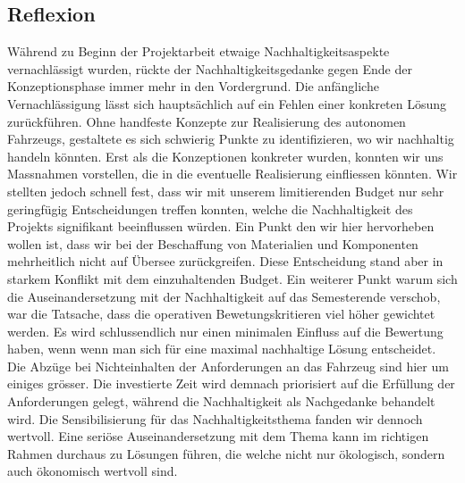 \documentclass[../../main.tex]{subfiles} %
\begin{document}
\subsection{Reflexion}

Während zu Beginn der Projektarbeit etwaige Nachhaltigkeitsaspekte
vernachlässigt
wurden, rückte der Nachhaltigkeitsgedanke gegen Ende der
Konzeptionsphase immer mehr in den Vordergrund.
Die anfängliche Vernachlässigung lässt sich hauptsächlich auf ein
Fehlen einer konkreten Lösung zurückführen.
Ohne handfeste Konzepte zur Realisierung des autonomen Fahrzeugs,
gestaltete es sich schwierig Punkte zu identifizieren,
wo wir nachhaltig handeln könnten. Erst als die Konzeptionen
konkreter wurden, konnten wir uns Massnahmen vorstellen,
die in die eventuelle Realisierung einfliessen könnten. Wir stellten
jedoch schnell fest, dass wir mit unserem limitierenden Budget nur
sehr geringfügig Entscheidungen treffen konnten, welche die
Nachhaltigkeit des Projekts signifikant beeinflussen würden.
Ein Punkt den wir hier hervorheben wollen ist, dass wir bei der
Beschaffung von Materialien und Komponenten
mehrheitlich nicht auf Übersee zurückgreifen. Diese Entscheidung
stand aber in starkem Konflikt mit dem
einzuhaltenden Budget. Ein weiterer Punkt warum sich die
Auseinandersetzung mit der Nachhaltigkeit auf
das Semesterende verschob, war die Tatsache, dass die operativen
Bewetungskritieren viel höher gewichtet werden.
Es wird schlussendlich nur einen minimalen Einfluss auf die Bewertung
haben, wenn wenn man sich für eine maximal nachhaltige Lösung entscheidet.
Die Abzüge bei Nichteinhalten der Anforderungen an das Fahrzeug sind
hier um einiges grösser.
Die investierte Zeit wird demnach priorisiert auf die Erfüllung der
Anforderungen gelegt, während die
Nachhaltigkeit als Nachgedanke behandelt wird.
Die Sensibilisierung für das Nachhaltigkeitsthema fanden wir dennoch
wertvoll. Eine seriöse Auseinandersetzung mit dem Thema
kann im richtigen Rahmen durchaus zu Lösungen führen, die welche
nicht nur ökologisch, sondern auch ökonomisch wertvoll sind.
\end{document}
